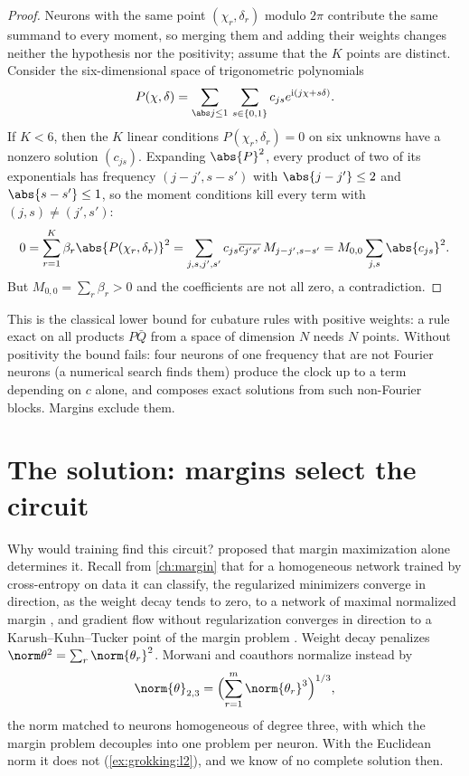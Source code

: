 \begin{refsection}
\begin{proof}
Neurons with the same point $(\chi_r,\delta_r)$ modulo $2\pi$ contribute the same summand to every moment, so merging them and adding their weights changes neither the hypothesis nor the positivity; assume that the $K$ points are distinct. Consider the six-dimensional space of trigonometric polynomials
\[
  P(\chi,\delta)=\sum_{\abs j\le1}\,\sum_{s\in\{0,1\}}c_{js}e^{\grokii(j\chi+s\delta)} .
\]
If $K<6$, then the $K$ linear conditions $P(\chi_r,\delta_r)=0$ on six unknowns have a nonzero solution $(c_{js})$. Expanding $\abs{P}^2$, every product of two of its exponentials has frequency $(j-j',s-s')$ with $\abs{j-j'}\le2$ and $\abs{s-s'}\le1$, so the moment conditions kill every term with $(j,s)\ne(j',s')$:
\[
  0=\sum_{r=1}^K\beta_r\abs{P(\chi_r,\delta_r)}^2=\sum_{j,s,j',s'}c_{js}\overline{c_{j's'}}\,M_{j-j',s-s'}=M_{0,0}\sum_{j,s}\abs{c_{js}}^2 .
\]
But $M_{0,0}=\sum_r\beta_r>0$ and the coefficients are not all zero, a contradiction.
\end{proof}

This is the classical lower bound for cubature rules with positive weights: a rule exact on all products $P\bar Q$ from a space of dimension $N$ needs $N$ points. Without positivity the bound fails: four neurons of one frequency that are not Fourier neurons (a numerical search finds them) produce the clock up to a term depending on $c$ alone, and \textcite{Tian2025} composes exact solutions from such non-Fourier blocks. Margins exclude them.

\section{The solution: margins select the circuit}\label{sec:grokking:margin}

Why would training find this circuit? \Textcite{MorwaniEtAl2024} proposed that margin maximization alone determines it. Recall from \cref{ch:margin} that for a homogeneous network trained by cross-entropy on data it can classify, the regularized minimizers converge in direction, as the weight decay tends to zero, to a network of maximal normalized margin \parencite{WeiEtAl2019}, and gradient flow without regularization converges in direction to a Karush--Kuhn--Tucker point of the margin problem \parencite{LyuLi2020}. Weight decay penalizes $\norm\theta^2=\sum_r\norm{\theta_r}^2$. Morwani and coauthors normalize instead by
\[
  \norm{\theta}_{2,3}=\Bigl(\sum_{r=1}^m\norm{\theta_r}^3\Bigr)^{1/3},
\]
the norm matched to neurons homogeneous of degree three, with which the margin problem decouples into one problem per neuron. With the Euclidean norm it does not (\cref{ex:grokking:l2}), and we know of no complete solution then.


\end{refsection}
